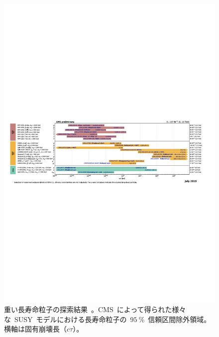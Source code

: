 \begin{figure}[H]
        \centering   
        \includegraphics[width=\textwidth,page=1]{img/pdf/susy2.pdf}
        \caption[重い長寿命粒子の探索結果]{重い長寿命粒子の探索結果~\cite{AR:13}。CMS~によって得られた様々な~SUSY~モデルにおける長寿命粒子の~$95~\%$~信頼区間除外領域。横軸は固有崩壊長（$c\tau$）。}\label{fig:susy2}
\end{figure}

